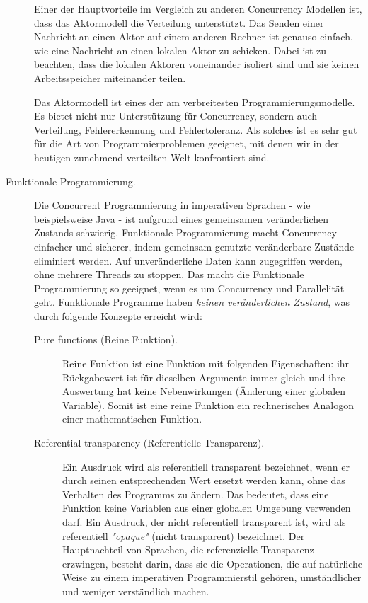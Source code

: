 \begin{description}
	Einer der Hauptvorteile im Vergleich zu anderen Concurrency Modellen ist, dass das Aktormodell die Verteilung unterstützt. Das Senden einer Nachricht an einen Aktor auf einem anderen Rechner ist genauso einfach, wie eine Nachricht an einen lokalen Aktor zu schicken. Dabei ist zu beachten, dass die lokalen Aktoren voneinander isoliert sind und sie keinen Arbeitsspeicher miteinander teilen.
	
	Das Aktormodell ist eines der am verbreitesten Programmierungsmodelle. Es bietet nicht nur Unterstützung für Concurrency, sondern auch Verteilung, Fehlererkennung und Fehlertoleranz. Als solches ist es sehr gut für die Art von Programmierproblemen geeignet, mit denen wir in der heutigen zunehmend verteilten Welt konfrontiert sind.
	
	\item[Funktionale Programmierung.] Die Concurrent Programmierung in imperativen Sprachen - wie beispielsweise Java - ist aufgrund eines gemeinsamen veränderlichen Zustands schwierig. Funktionale Programmierung macht Concurrency einfacher und sicherer, indem gemeinsam genutzte veränderbare Zustände eliminiert werden. Auf unveränderliche Daten kann zugegriffen werden, ohne mehrere Threads zu stoppen. Das macht die Funktionale Programmierung so geeignet, wenn es um Concurrency und Parallelität geht. Funktionale Programme haben \textit{keinen veränderlichen Zustand}, was durch folgende Konzepte erreicht wird:
	
	\begin{description} 
		\item[Pure functions (Reine Funktion).] Reine Funktion ist eine Funktion mit folgenden Eigenschaften: ihr Rückgabewert ist für dieselben Argumente immer gleich und ihre Auswertung hat keine Nebenwirkungen (Änderung einer globalen Variable). Somit ist eine reine Funktion ein rechnerisches Analogon einer mathematischen Funktion.
		
		\item[Referential transparency (Referentielle Transparenz).] Ein Ausdruck wird als referentiell transparent bezeichnet, wenn er durch seinen entsprechenden Wert ersetzt werden kann, ohne das Verhalten des Programms zu ändern. Das bedeutet, dass eine Funktion keine Variablen aus einer globalen Umgebung verwenden darf. Ein Ausdruck, der nicht referentiell transparent ist, wird als referentiell \textit{"opaque"} (nicht transparent) bezeichnet. Der Hauptnachteil von Sprachen, die referenzielle Transparenz erzwingen, besteht darin, dass sie die Operationen, die auf natürliche Weise zu einem imperativen Programmierstil gehören, umständlicher und weniger verständlich machen.
	\end{description}
	

\end{description}
